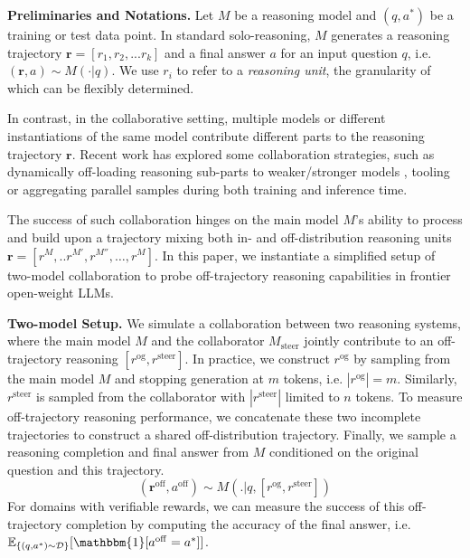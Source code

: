 \documentclass{article} %
\begin{document}
\textbf{Preliminaries and Notations.} Let $M$ be a reasoning model and $(q, a^{*})$ be a training or test data point. In standard solo-reasoning, $M$ generates a reasoning trajectory $\mathbf{r} = [r_1, r_2, ... r_k]$ and a final answer $a$ for an input question $q$, i.e. $(\mathbf{r}, a) \sim M(\cdot|q)$. We use $r_i$ to refer to a \textit{reasoning unit}, the granularity of which can be flexibly determined. 

In contrast, in the collaborative setting, multiple models or different instantiations of the same model contribute different parts to the reasoning trajectory $\mathbf{r}$. Recent work has explored some collaboration strategies, such as dynamically off-loading reasoning sub-parts to weaker/stronger models \citep{yan2025learning, zhou2025expo,akhauri2025splitreason}, tooling \citep{jin2025search} or aggregating parallel samples \citep{zhao2025majority, qi2025learning} during both training and inference time.


The success of such collaboration hinges on the main model $M$'s ability to process and build upon a trajectory mixing both in- and off-distribution reasoning units $\mathbf{r} = [r^{M}, .. r^{M'}, r^{M''},\ldots, r^{M}]$.  In this paper, we instantiate a simplified setup of two-model collaboration to probe off-trajectory reasoning capabilities in frontier open-weight LLMs.

\textbf{Two-model Setup.} We simulate a collaboration between two reasoning systems, where the main model $M$ and the collaborator $M_\mathrm{steer}$ jointly contribute to an off-trajectory reasoning $[r^\mathrm{og}, r^\mathrm{steer}]$. In practice, we construct $r^\mathrm{og}$ by sampling from the main model $M$ and stopping generation at $m$ tokens, i.e. $|r^\mathrm{og}| = m$. Similarly, $r^\mathrm{steer}$ is sampled from the collaborator with $|r^\mathrm{steer}| $ limited to $ n$ tokens. To measure off-trajectory reasoning performance, we concatenate these two incomplete trajectories to construct a shared off-distribution trajectory. Finally, we sample a reasoning completion and final answer from $M$ conditioned on the original question and this trajectory.
\begin{equation*}
    (\mathbf{r}^\mathrm{off}, a^\mathrm{off}) \sim M(. | q,  [r^\mathrm{og}, r^\mathrm{steer}])
\end{equation*} 
For domains with verifiable rewards, we can measure the success of this off-trajectory completion by computing the accuracy of the final answer, i.e. $\mathbb{E}_{\{(q, a^{*}) \sim \mathcal{D} \}}[\mathbbm{1}[a^\mathrm{off} =a^*]]$. 
\end{document}
